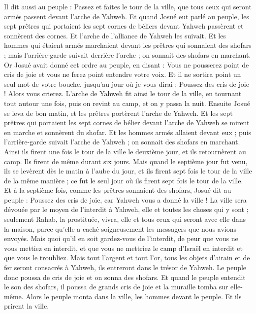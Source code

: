 \begin{multicols}{2}
Il dit aussi au peuple : Passez et faites le tour de la ville, que tous ceux qui seront armés passent devant l'arche de Yahweh.
Et quand Josué eut parlé au peuple, les sept prêtres qui portaient les sept cornes de béliers devant Yahweh passèrent et sonnèrent des cornes. Et l'arche de l'alliance de Yahweh les suivait.
Et les hommes qui étaient armés marchaient devant les prêtres qui sonnaient des shofars ; mais l'arrière-garde suivait derrière l'arche ; on sonnait des shofars en marchant.
Or Josué avait donné cet ordre au peuple, en disant : Vous ne pousserez point de cris de joie et vous ne ferez point entendre votre voix. Et il ne sortira point un seul mot de votre bouche, jusqu'au jour où je vous dirai : Poussez des cris de joie ! Alors vous crierez.
L'arche de Yahweh fit ainsi le tour de la ville, en tournant tout autour une fois, puis on revint au camp, et on y passa la nuit.
Ensuite Josué se leva de bon matin, et les prêtres portèrent l'arche de Yahweh.
Et les sept prêtres qui portaient les sept cornes de bélier devant l'arche de Yahweh se mirent en marche et sonnèrent du shofar. Et les hommes armés allaient devant eux ; puis l'arrière-garde suivait l'arche de Yahweh ; on sonnait des shofars en marchant.
Ainsi ils firent une fois le tour de la ville le deuxième jour, et ils retournèrent au camp. Ils firent de même durant six jours.
Mais quand le septième jour fut venu, ils se levèrent dès le matin à l'aube du jour, et ils firent sept fois le tour de la ville de la même manière ; ce fut le seul jour où ils firent sept fois le tour de la ville.
Et à la septième fois, comme les prêtres sonnaient des shofars, Josué dit au peuple : Poussez des cris de joie, car Yahweh vous a donné la ville !
La ville sera dévouée par le moyen de l'interdit à Yahweh, elle et toutes les choses qui y sont ; seulement Rahab, la prostituée, vivra, elle et tous ceux qui seront avec elle dans la maison, parce qu'elle a caché soigneusement les messagers que nous avions envoyés.
Mais quoi qu'il en soit gardez-vous de l'interdit, de peur que vous ne vous mettiez en interdit, et que vous ne mettriez le camp d'Israël en interdit et que vous le troubliez.
Mais tout l'argent et tout l'or, tous les objets d'airain et de fer seront consacrés à Yahweh, ils entreront dans le trésor de Yahweh.
Le peuple donc poussa de cris de joie et on sonna des shofars. Et quand le peuple entendit le son des shofars, il poussa de grands cris de joie et la muraille tomba sur elle-même. Alors le peuple monta dans la ville, les hommes devant le peuple. Et ils prirent la ville. 

\end{multicols}
